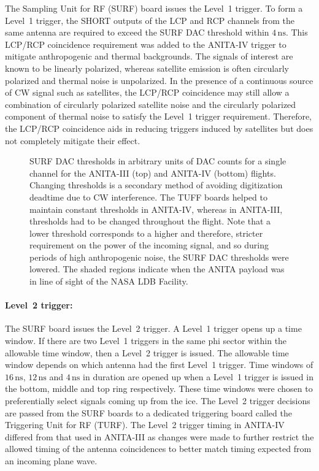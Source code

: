 \documentclass[preprint,12pt]{elsarticle}
\begin{document}
The Sampling Unit for RF (SURF) board issues the Level~1 trigger.
To form a Level~1 trigger, the SHORT outputs of the LCP and RCP channels from the same antenna 
are required to exceed the SURF DAC threshold within $4\,\mbox{ns}$. This LCP/RCP coincidence requirement 
was added to the ANITA-IV trigger to mitigate anthropogenic and thermal backgrounds.
The signals of
interest are known to be linearly polarized, whereas satellite emission is often circularly polarized
and thermal noise is unpolarized. In the presence of a continuous source of CW signal such as satellites,
the LCP/RCP coincidence may still allow a combination of circularly polarized satellite noise and the circularly polarized component of
thermal noise to satisfy the Level~1 trigger requirement. Therefore, the LCP/RCP coincidence aids in
reducing triggers induced by satellites but does not completely mitigate their effect.

\begin{figure}[H]
\centering
{}
\caption[]{SURF DAC thresholds in arbitrary units of DAC counts for a single channel for the ANITA-III (top) and ANITA-IV (bottom) flights. 
Changing thresholds is a secondary method of avoiding digitization deadtime due to CW interference. 
The TUFF boards helped to maintain constant thresholds in ANITA-IV, 
whereas in ANITA-III, thresholds had to be changed throughout the flight.
Note that a lower threshold corresponds to a higher and therefore, stricter requirement on the power of the incoming signal, and so during periods of high anthropogenic noise, the SURF DAC thresholds were lowered.
The shaded regions indicate when the 
ANITA payload was in line of sight of the NASA LDB Facility. 
}
\label{thresholds}
\end{figure}

\paragraph{Level~2 trigger:} 

The SURF board issues the Level~2 trigger. 
A Level~1 trigger opens up a time window.
If there are two Level~1 triggers in the same phi sector within the allowable time window, then a Level~2 trigger is issued. 
The allowable time window depends on which antenna had the first Level~1 trigger. 
Time windows of
$16\,\mbox{ns}$, $12\,\mbox{ns}$ and $4\,\mbox{ns}$ in duration are
opened up when a Level~1 trigger is issued in the bottom, middle and top ring respectively.
These time windows were chosen to preferentially select signals coming up from the ice. 
The Level~2 trigger decisions are passed from the SURF boards to a dedicated triggering board called the Triggering Unit for RF (TURF).
The Level~2 trigger timing in ANITA-IV differed from that used in ANITA-III as changes were made to further restrict
the allowed timing of the antenna coincidences to 
better match timing expected from an incoming plane wave.
\end{document}
